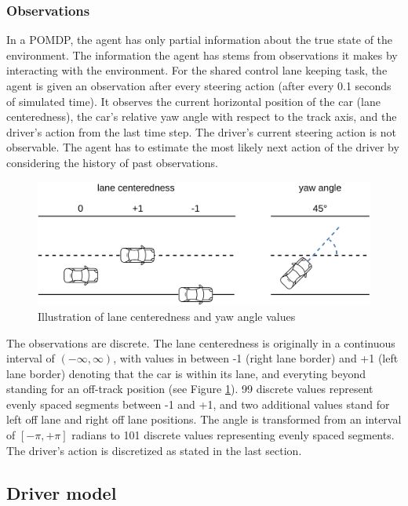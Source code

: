 \subsubsection{Observations}
\label{sec:observations}

In a POMDP, the agent has only partial information about the true state of the environment. The information the agent has stems from observations it makes by interacting with the environment. For the shared control lane keeping task, the agent is given an observation after every steering action (after every 0.1 seconds of simulated time). It observes the current horizontal position of the car (lane centeredness), the car's relative yaw angle with respect to the track axis, and the driver's action from the last time step. The driver's current steering action is not observable. The agent has to estimate the most likely next action of the driver by considering the history of past observations. 

\begin{figure}[htbp]
    \includegraphics[width=0.6\linewidth]{figures/angle_distance.pdf}
    \centering
    \caption{Illustration of lane centeredness and yaw angle values}
    \label{fig:observations}
\end{figure}

The observations are discrete. The lane centeredness is originally in a continuous interval of $(-\infty,\infty)$, with values in between -1 (right lane border) and +1 (left lane border) denoting that the car is within its lane, and everyting beyond standing for an off-track position (see Figure \ref{fig:observations}). 99 discrete values represent evenly spaced segments between -1 and +1, and two additional values stand for left off lane and right off lane positions. The angle is transformed from an interval of $[-\pi, +\pi]$ radians to 101 discrete values representing evenly spaced segments. The driver's action is discretized as stated in the last section.

\subsection{Driver model}
\label{sec:driver_model}

